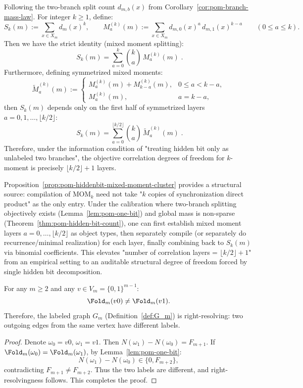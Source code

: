 \begin{proposition}\label{prop:pom-hiddenbit-mixed-moment-cluster}\label{prop:pom-mixed-moment-clusters}
Following the two-branch split count $d_{m,b}(x)$ from Corollary~\ref{cor:pom-branch-mass-law}.
For integer $k\ge 1$, define:
\[
S_k(m):=\sum_{x\in X_m} d_m(x)^k,
\qquad
M^{(k)}_{a}(m):=\sum_{x\in X_m} d_{m,0}(x)^a\,d_{m,1}(x)^{k-a}\qquad(0\le a\le k).
\]
Then we have the strict identity (mixed moment splitting):
\[
\boxed{\;
S_k(m)=\sum_{a=0}^{k}\binom{k}{a}\,M^{(k)}_{a}(m)\; }.
\]
Furthermore, defining symmetrized mixed moments:
\[
\widetilde M^{(k)}_{a}(m):=
\begin{cases}
M^{(k)}_{a}(m)+M^{(k)}_{k-a}(m), & 0\le a<k-a,\\
M^{(k)}_{a}(m), & a=k-a,
\end{cases}
\]
then $S_k(m)$ depends only on the first half of symmetrized layers $a=0,1,\dots,\lfloor k/2\rfloor$:
\[
\boxed{\;
S_k(m)=\sum_{a=0}^{\lfloor k/2\rfloor}\binom{k}{a}\,\widetilde M^{(k)}_{a}(m)\; }.
\]
Therefore, under the information condition of "treating hidden bit only as unlabeled two branches", the objective correlation degrees of freedom for $k$-moment is precisely $\lfloor k/2\rfloor+1$ layers.
\end{proposition}

\begin{remark}\label{rem:pom-hiddenbit-mixed-moment-typing}
Proposition~\ref{prop:pom-hiddenbit-mixed-moment-cluster} provides a structural source: compilation of $\mathrm{MOM}_k$ need not take "$k$ copies of synchronization direct product" as the only entry.
Under the calibration where two-branch splitting objectively exists (Lemma~\ref{lem:pom-one-bit}) and global mass is non-sparse (Theorem~\ref{thm:pom-hidden-bit-count}),
one can first establish mixed moment layers $a=0,\dots,\lfloor k/2\rfloor$ as object types, then separately compile (or separately do recurrence/minimal realization) for each layer, finally combining back to $S_k(m)$ via binomial coefficients.
This elevates "number of correlation layers = $\lfloor k/2\rfloor+1$" from an empirical setting to an auditable structural degree of freedom forced by single hidden bit decomposition.
\end{remark}

\begin{theorem}\label{thm:pom-right-resolving}
For any $m\ge 2$ and any $v\in V_m=\{0,1\}^{m-1}$:
\[
\Fold_m(v0)\neq \Fold_m(v1).
\]
Therefore, the labeled graph $G_m$ (Definition~\ref{def:G_m}) is right-resolving: two outgoing edges from the same vertex have different labels.
\end{theorem}
\begin{proof}
Denote $\omega_0=v0$, $\omega_1=v1$. Then $N(\omega_1)-N(\omega_0)=F_{m+1}$. If $\Fold_m(\omega_0)=\Fold_m(\omega_1)$, by Lemma~\ref{lem:pom-one-bit}:
\[
N(\omega_1)-N(\omega_0)\in\{0,F_{m+2}\},
\]
contradicting $F_{m+1}\neq F_{m+2}$. Thus the two labels are different, and right-resolvingness follows. This completes the proof.
\end{proof}

